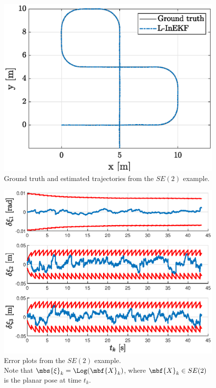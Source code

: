\documentclass[nobib, nofonts, notoc, justified]{tufte-handout}
\begin{document}
  \begin{figure}[h]
    \centering
    \includegraphics[width=\textwidth]{figs/se2_example_trajectories.eps}
    \caption{Ground truth and estimated trajectories from the $SE(2)$ example.}
    \label{fig:se2_example_trajectories}
  \end{figure}

  \begin{figure}[h]
    \centering
    \includegraphics[width=\textwidth]{figs/se2_example_error_plots.eps}
    \caption{Error plots from the $SE(2)$ example.\\ Note that $\mbs{\xi}_{k} = \Log(\mbf{X}_{k})$, where $\mbf{X}_{k}\in SE(2)$ is the planar pose at time $t_{k}$.}
    \label{fig:se2_example_error_plots}
  \end{figure}

  \clearpage
  \begin{appendices}
    
  \end{appendices}

  \clearpage
  \printbibliography
\end{document}
